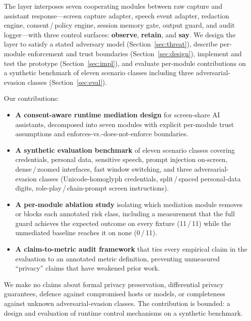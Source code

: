 \documentclass[sn-mathphys-num]{sn-jnl}
\begin{document}
The layer interposes seven cooperating modules between raw capture and
assistant response---screen capture adapter, speech event adapter, redaction
engine, consent\,/\,policy engine, session memory gate, output guard, and
audit logger---with three control surfaces: \textbf{observe}, \textbf{retain},
and \textbf{say}.
We design the layer to satisfy a stated adversary model
(Section~\ref{sec:threat}), describe per-module enforcement and trust
boundaries (Section~\ref{sec:design}), implement and test the prototype
(Section~\ref{sec:impl}), and evaluate per-module contributions on a synthetic
benchmark of eleven scenario classes including three adversarial-evasion
classes (Section~\ref{sec:eval}).

Our contributions:

\begin{itemize}
  \item \textbf{A consent-aware runtime mediation design} for screen-share AI
        assistants, decomposed into seven modules with explicit per-module
        trust assumptions and enforces-vs.-does-not-enforce boundaries.
  \item \textbf{A synthetic evaluation benchmark} of eleven scenario classes
        covering credentials, personal data, sensitive speech, prompt injection
        on-screen, dense\,/\,zoomed interfaces, fast window switching, and
        three adversarial-evasion classes (Unicode-homoglyph credentials,
        split\,/\,spaced personal-data digits, role-play\,/\,chain-prompt
        screen instructions).
  \item \textbf{A per-module ablation study} isolating which mediation module
        removes or blocks each annotated risk class, including a measurement
        that the full guard achieves the expected outcome on every fixture
        (11\,/\,11) while the unmediated baseline reaches it on none (0\,/\,11).
  \item \textbf{A claim-to-metric audit framework} that ties every empirical
        claim in the evaluation to an annotated metric definition, preventing
        unmeasured ``privacy'' claims that have weakened prior work.
\end{itemize}

We make no claims about formal privacy preservation, differential privacy
guarantees, defence against compromised hosts or models, or completeness
against unknown adversarial-evasion classes.
The contribution is bounded: a design and evaluation of runtime control
mechanisms on a synthetic benchmark.
\end{document}
